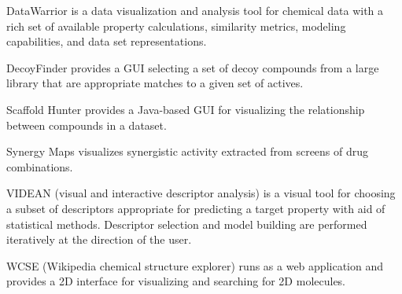DataWarrior \cite{Sander_2015} is a data visualization and analysis tool for chemical data with a rich set of available property calculations, similarity metrics, modeling capabilities, and data set representations.

DecoyFinder \cite{Cereto_Massague_2012} provides a GUI selecting a set of decoy compounds from a large library that are appropriate matches to a given set of actives.

 Scaffold Hunter \cite{Wetzel_2009} provides a Java-based GUI for visualizing the relationship between compounds in a dataset.

Synergy Maps \cite{Lewis_2015} visualizes synergistic activity extracted from screens of drug combinations. 

VIDEAN (visual and interactive descriptor analysis) \cite{Mart_nez_2015} is a visual tool for choosing a subset of descriptors appropriate for predicting a target property with aid of statistical methods.  Descriptor selection and model building are performed iteratively at the direction of the user.

WCSE (Wikipedia chemical structure explorer) \cite{Ertl_2015} runs as a web application and provides a 2D interface for visualizing and searching for 2D molecules.

